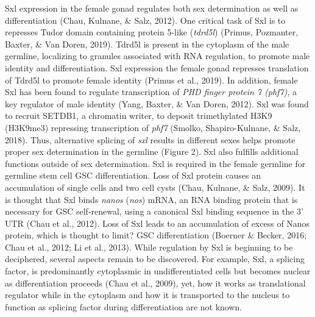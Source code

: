 \documentclass[12pt,twoside]{reedthesis}
\begin{document}
Sxl expression in the female gonad regulates both sex determination as
well as differentiation (Chau, Kulnane, \& Salz, 2012). One critical task of Sxl is to
represses Tudor domain containing protein 5-like (\emph{tdrd5l})
(Primus, Pozmanter, Baxter, \& Van Doren, 2019). Tdrd5l is present in the cytoplasm of the male
germline, localizing to granules associated with RNA regulation, to
promote male identity and differentiation. Sxl expression the female
gonad represses translation of Tdrd5l to promote female identity
(Primus et al., 2019). In addition, female Sxl has been found to regulate
transcription of \emph{PHD finger protein 7 (phf7)}, a key regulator of male
identity (Yang, Baxter, \& Van Doren, 2012). Sxl was found to recruit SETDB1, a chromatin
writer, to deposit trimethylated H3K9 (H3K9me3) repressing transcription
of \emph{phf7} (Smolko, Shapiro-Kulnane, \& Salz, 2018). Thus, alternative splicing of \emph{sxl} results
in different sexes helps promote proper sex determination in the
germline (Figure 2). Sxl also fulfills additional functions outside of
sex determination. Sxl is required in the female germline for germline
stem cell GSC differentiation. Loss of Sxl protein causes an
accumulation of single cells and two cell cysts (Chau, Kulnane, \& Salz, 2009). It is
thought that Sxl binds \emph{nanos} (\emph{nos}) mRNA, an RNA binding protein that
is necessary for GSC self-renewal, using a canonical Sxl binding
sequence in the 3' UTR (Chau et al., 2012). Loss of Sxl leads to an
accumulation of excess of Nanos protein, which is thought to limit? GSC
differentiation (Boerner \& Becker, 2016; Chau et al., 2012; Li et al., 2013). While
regulation by Sxl is beginning to be deciphered, several aspects remain
to be discovered. For example, Sxl, a splicing factor, is predominantly
cytoplasmic in undifferentiated cells but becomes nuclear as
differentiation proceeds (Chau et al., 2009), yet, how it works as
translational regulator while in the cytoplasm and how it is transported
to the nucleus to function as splicing factor during differentiation are
not known.
\end{document}
